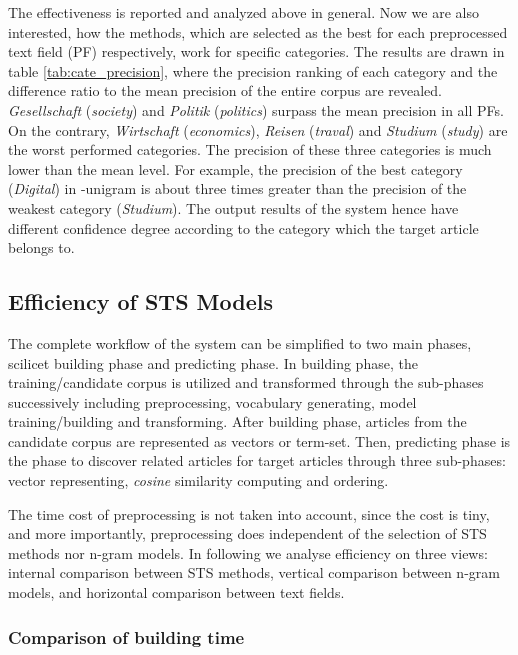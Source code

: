 The effectiveness is reported and analyzed above in general. Now we are also interested, how the methods, which are selected as the best for each preprocessed text field (PF) respectively, work for specific categories. The results are drawn in table \ref{tab:cate_precision}, where the precision ranking of each category and the difference ratio to the mean precision of the entire corpus are revealed. \textit{Gesellschaft} (\textit{society}) and \textit{Politik} (\textit{politics}) surpass the mean precision in all PFs. On the contrary, \textit{Wirtschaft} (\textit{economics}), \textit{Reisen} (\textit{traval}) and \textit{Studium} (\textit{study}) are the worst performed categories. The precision of these three categories is much lower than the mean level. For example, the precision of the best category (\textit{Digital}) in \icontent{}-unigram is about three times greater than the precision of the weakest category (\textit{Studium}). The output results of the system hence have different confidence degree according to the category which the target article belongs to. 

\subsection{Efficiency of STS Models}
\label{sec:5.3}

The complete workflow of the system can be simplified to two main phases, scilicet building phase and predicting phase. In building phase, the training/candidate corpus is utilized and transformed through the sub-phases successively including preprocessing, vocabulary generating, model training/building and transforming. After building phase, articles from the candidate corpus are represented as vectors or term-set. Then, predicting phase is the phase to discover related articles for target articles through three sub-phases: vector representing, \textit{cosine} similarity computing and ordering. 

The time cost of preprocessing is not taken into account, since the cost is tiny, and more importantly, preprocessing does independent of the selection of STS methods nor n-gram models. In following we analyse efficiency on three views: internal comparison between STS methods, vertical comparison between n-gram models, and horizontal comparison between text fields. 

\subsubsection{Comparison of building time}


